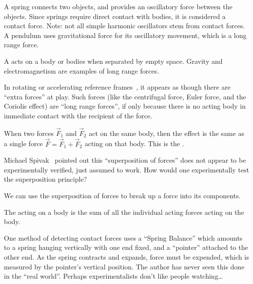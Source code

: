 \begin{ex}[Spring]
A spring connects two objects, and provides an oscillatory force between
the objects. Since springs require direct contact with bodies, it is
considered a contact force. Note: not all simple harmonic oscillators
stem from contact forces. A pendulum uses gravitational force for its
oscillatory movement, which is a long range force.
\end{ex}

\begin{definition}
A  acts on a body or
bodies when separated by empty space. Gravity and electromagnetism are
examples of long range forces.
\end{definition}

\begin{ex}
In rotating or accelerating reference frames~,
it appears as though there are ``extra forces'' at play. Such forces
(like the centrifugal force, Euler force, and the Coriolis effect) are
``long range forces'', if only because there is no acting body in
immediate contact with the recipient of the force.
\end{ex}

When two forces $\vec{F}_{1}$ and $\vec{F}_{2}$ act on the same body,
then the effect is the same as a single force
$\vec{F}=\vec{F}_{1}+\vec{F}_{2}$ acting on that body. This is the
.

\begin{remark}
Michael Spivak~\cite{spivak} pointed out this ``superposition of forces''
does not appear to be experimentally verified, just assumed to work. How
would one experimentally test the superposition principle?
\end{remark}
\begin{remark}
We can use the superposition of forces to break up a force into its
components.
\end{remark}

\begin{definition}
The  acting on a body is the sum of all the individual
acting forces acting on the body.
\end{definition}

One method of detecting contact forces uses a ``Spring Balance''%
which amounts to a spring hanging vertically with one end fixed, and a
``pointer'' attached to the other end. As the spring contracts and
expands, force must be expended, which is measured by the pointer's
vertical position. The author has never seen this done in the ``real world''.
Perhaps experimentalists don't like people watching\dots

